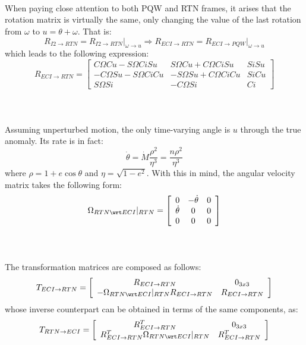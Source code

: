 			\paragraph{\\}
			\indent When paying close attention to both PQW and RTN frames, it arises that the rotation matrix is virtually the same, only changing the value of the last rotation from $\omega$ to $u = \theta + \omega$. That is:
			\[
			R_{I2 \to RTN} = R_{I2\to RTN} \rvert_{\omega \to u} \Rightarrow R_{ECI\to RTN} = R_{ECI\to PQW}\rvert_{\omega \to u}
			\]
			\noindent which leads to the following expression:
			\[
			R_{ECI\to RTN} = \left[ \begin{array}{ccc}
			C\Omega C u - S\Omega C i S u 			& S\Omega C u + C\Omega C i S u & S i S u \\
			-C\Omega S u - S\Omega C i C u 			& -S\Omega S u + C\Omega C i C u & S i C u \\
			S\Omega S i 							& - C\Omega S i 			& C i
			\end{array}\right]
			\]
			\paragraph{ \\}
			\indent Assuming unperturbed motion, the only time-varying angle is $u$ through the true anomaly. Its rate is in fact:
			\[
			\dot{\theta} = \dot{M} \dfrac{\rho^2}{\eta^{3}} = \dfrac{n \rho^2}{\eta^3}
			\]
			\noindent where $\rho = 1 + e \cos\theta$ and $\eta = \sqrt{1 - e^2}$. With this in mind, the angular velocity matrix takes the following form:
			\[
			\Omega_{RTN\wrt ECI}\rvert_{RTN} = \left[ \begin{array}{ccc}
			0 			& -\dot{\theta} 	& 0 \\
			\dot{\theta} & 0 			& 0 \\
			0 			& 0 			& 0
			\end{array}\right]
			\]
			\paragraph{ \\}
			\indent The transformation matrices are composed as follows:
			\[
			 T_{ECI\to RTN} = \left[\begin{array}{cc}
	R_{ECI\to RTN} & 0_{3x3} \\
	-\Omega_{RTN \wrt ECI}\rvert_{RTN} R_{ECI\to RTN}   & R_{ECI\to RTN} 
	\end{array}\right]
			\]
			\noindent whose inverse counterpart can be obtained in terms of the same components, as:
			\[
			 T_{RTN\to ECI} = \left[\begin{array}{cc}
	R_{ECI\to RTN}^T & 0_{3x3} \\
	R_{ECI\to RTN}^T\Omega_{RTN \wrt ECI}\rvert_{RTN} & R_{ECI\to RTN}^T
	\end{array}\right]
			\]
			

